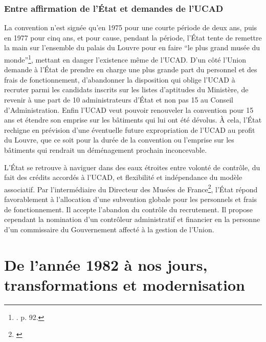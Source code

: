 \subsection{Entre affirmation de l'État et demandes de l'UCAD}

La convention n'est signée qu'en 1975 pour une courte période de deux ans, puis en 1977 pour cinq ans, et pour cause, pendant la période, l'État tente de remettre la main sur l'ensemble du palais du Louvre pour en faire \enquote{le plus grand musée du monde}\footnote{\cite{brunhammer_beau_1992}. p. 92.}, mettant en danger l'existence même de l'UCAD. D'un côté l'Union demande à l'État de prendre en charge une plus grande part du personnel et des frais de fonctionnement, d'abandonner la disposition qui oblige l'UCAD à recruter parmi les candidats inscrits sur les listes d'aptitudes du Ministère, de revenir à une part de 10 administrateurs d'État et non pas 15 au Conseil d'Administration. Enfin l'UCAD veut pouvoir renouveler la convention pour 15 ans et étendre son emprise sur les bâtiments qui lui ont été dévolus. À cela, l'État rechigne en prévision d'une éventuelle future expropriation de l'UCAD au profit du Louvre, que ce soit pour la durée de la convention ou l'emprise sur les bâtiments qui rendrait un déménagement prochain inconcevable. 

L'État se retrouve à naviguer dans des eaux étroites entre volonté de contrôle, du fait des crédits accordés à l'UCAD, et flexibilité et indépendance du modèle associatif. Par l'intermédiaire du Directeur des Musées de France\footnote{\cite{noauthor__1971}}, l'État répond favorablement à l'allocation d'une subvention globale pour les personnels et frais de fonctionnement. Il accepte l'abandon du contrôle du recrutement. Il propose cependant la nomination d'un contrôleur administratif et financier en la personne d'un commissaire du Gouvernement affecté à la gestion de l'Union.


\chapter{De l’année 1982 à nos jours, transformations et modernisation}

